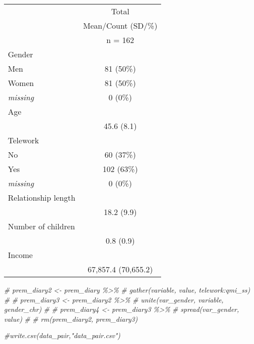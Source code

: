 \documentclass[
]{article}
\newenvironment{Shaded}{\begin{snugshade}}{\end{snugshade}}
\newcommand{\CommentTok}[1]{\textcolor[rgb]{0.56,0.35,0.01}{\textit{#1}}}
\begin{document}
\begin{table}[ ht ] 
\centering 
\caption{}\label{}
\begin{tabular}{ l c }
\toprule
 &   \multicolumn{ 1 }{c}{ Total }\\ 
  & Mean/Count (SD/\%) \\ 
 & n = 162 \\ 
 \midrule
Gender &  \\ 
\hspace{6pt}    Men & 81 (50\%)\\ 
\hspace{6pt}    Women & 81 (50\%)\\ 
\hspace{6pt}    \emph{missing} & 0 (0\%)\\ 
Age &  \\ 
\hspace{6pt}   & 45.6 (8.1)\\ 
Telework &  \\ 
\hspace{6pt}    No & 60 (37\%)\\ 
\hspace{6pt}    Yes & 102 (63\%)\\ 
\hspace{6pt}    \emph{missing} & 0 (0\%)\\ 
Relationship length &  \\ 
\hspace{6pt}   & 18.2 (9.9)\\ 
Number of children &  \\ 
\hspace{6pt}   & 0.8 (0.9)\\ 
Income &  \\ 
\hspace{6pt}   & 67,857.4 (70,655.2)\\ 
\bottomrule

\end{tabular}
\end{table}

\begin{Shaded}
\begin{Highlighting}[]
\CommentTok{\# prem\_diary2 \textless{}{-} prem\_diary \%\textgreater{}\%}
\CommentTok{\#   gather(variable, value, telework:qmi\_ss)}
\CommentTok{\# }
\CommentTok{\# prem\_diary3 \textless{}{-} prem\_diary2 \%\textgreater{}\%}
\CommentTok{\#   unite(var\_gender, variable, gender\_chr)}
\CommentTok{\# }
\CommentTok{\# prem\_diary4 \textless{}{-} prem\_diary3 \%\textgreater{}\%}
\CommentTok{\#   spread(var\_gender, value)}
\CommentTok{\# }
\CommentTok{\# rm(prem\_diary2, prem\_diary3)}
\end{Highlighting}
\end{Shaded}

\begin{Shaded}
\begin{Highlighting}[]
\CommentTok{\#write.csv(data\_pair,"data\_pair.csv")}
\end{Highlighting}
\end{Shaded}
\end{document}

